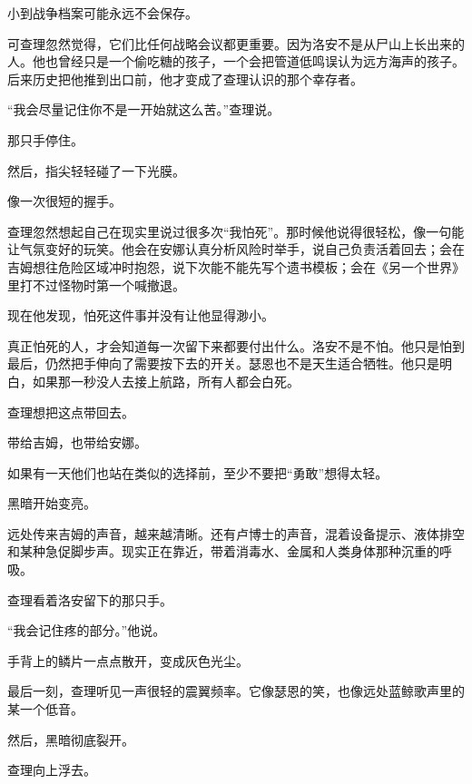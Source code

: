 小到战争档案可能永远不会保存。

可查理忽然觉得，它们比任何战略会议都更重要。因为洛安不是从尸山上长出来的人。他也曾经只是一个偷吃糖的孩子，一个会把管道低鸣误认为远方海声的孩子。后来历史把他推到出口前，他才变成了查理认识的那个幸存者。

“我会尽量记住你不是一开始就这么苦。”查理说。

那只手停住。

然后，指尖轻轻碰了一下光膜。

像一次很短的握手。

查理忽然想起自己在现实里说过很多次“我怕死”。那时候他说得很轻松，像一句能让气氛变好的玩笑。他会在安娜认真分析风险时举手，说自己负责活着回去；会在吉姆想往危险区域冲时抱怨，说下次能不能先写个遗书模板；会在《另一个世界》里打不过怪物时第一个喊撤退。

现在他发现，怕死这件事并没有让他显得渺小。

真正怕死的人，才会知道每一次留下来都要付出什么。洛安不是不怕。他只是怕到最后，仍然把手伸向了需要按下去的开关。瑟恩也不是天生适合牺牲。他只是明白，如果那一秒没人去接上航路，所有人都会白死。

查理想把这点带回去。

带给吉姆，也带给安娜。

如果有一天他们也站在类似的选择前，至少不要把“勇敢”想得太轻。

黑暗开始变亮。

远处传来吉姆的声音，越来越清晰。还有卢博士的声音，混着设备提示、液体排空和某种急促脚步声。现实正在靠近，带着消毒水、金属和人类身体那种沉重的呼吸。

查理看着洛安留下的那只手。

“我会记住疼的部分。”他说。

手背上的鳞片一点点散开，变成灰色光尘。

最后一刻，查理听见一声很轻的震翼频率。它像瑟恩的笑，也像远处蓝鲸歌声里的某一个低音。

然后，黑暗彻底裂开。

查理向上浮去。
